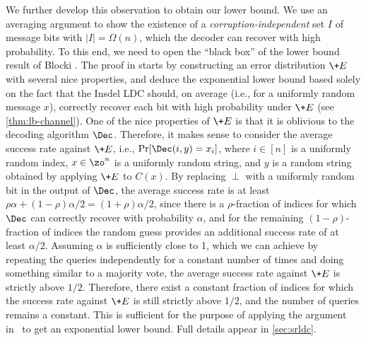 We further develop this observation to obtain our lower bound. 
We use an averaging argument to show the existence of a \emph{corruption-independent} set $I$ of message bits with $|I|=\Omega(n)$, which the decoder can recover with high probability. To this end, we need to open the ``black box'' of the lower bound result of Blocki \etal \cite{blocki2021exponential}. The proof in \cite{blocki2021exponential} starts by constructing an error distribution $\+E$ with several nice properties, and deduce the exponential lower bound based solely on the fact that the Insdel LDC should, on average (i.e., for a uniformly random message $x$), correctly recover each bit with high probability under $\+E$ (see \cref{thm:lb-channel}). One of the nice properties of $\+E$ is that it is oblivious to the decoding algorithm $\Dec$. Therefore, it makes sense to consider the average success rate against $\+E$, i.e., $\Pr[\Dec(i,y)=x_i]$, where $i \in [n]$ is a uniformly random index, $x \in \zo^n$ is a uniformly random string, and $y$ is a random string obtained by applying $\+E$ to $C(x)$. By replacing $\perp$ with a uniformly random bit in the output of $\Dec$, the average success rate is at least $\rho\alpha+(1-\rho)\alpha/2=(1+\rho)\alpha/2$, since there is a $\rho$-fraction of indices for which $\Dec$ can correctly recover with probability $\alpha$, and for the remaining $(1-\rho)$-fraction of indices the random guess provides an additional success rate of at least $\alpha/2$. Assuming $\alpha$ is sufficiently close to 1, which we can achieve by repeating the queries independently for a constant number of times and doing something similar to a majority vote, the average success rate against $\+E$ is strictly above $1/2$. Therefore, there exist a constant fraction of indices for which the success rate against $\+E$ is still strictly above $1/2$, and the number of queries remains a constant. This is sufficient for the purpose of applying the argument in~\cite{blocki2021exponential} to get an exponential lower bound.
Full details appear in \cref{sec:srldc}.

